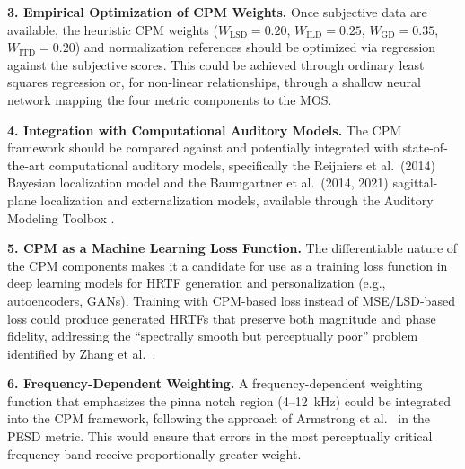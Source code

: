 \documentclass[12pt,a4paper]{article}
\begin{document}
\textbf{3. Empirical Optimization of CPM Weights.}
Once subjective data are available, the heuristic CPM weights ($W_{\mathrm{LSD}} = 0.20$, $W_{\mathrm{ILD}} = 0.25$, $W_{\mathrm{GD}} = 0.35$, $W_{\mathrm{ITD}} = 0.20$) and normalization references should be optimized via regression against the subjective scores. This could be achieved through ordinary least squares regression or, for non-linear relationships, through a shallow neural network mapping the four metric components to the MOS.

\textbf{4. Integration with Computational Auditory Models.}
The CPM framework should be compared against and potentially integrated with state-of-the-art computational auditory models, specifically the Reijniers et al.\ (2014) \cite{reijniers2014} Bayesian localization model and the Baumgartner et al.\ (2014, 2021) \cite{baumgartner2014,baumgartner2021} sagittal-plane localization and externalization models, available through the Auditory Modeling Toolbox \cite{majdak2022}.

\textbf{5. CPM as a Machine Learning Loss Function.}
The differentiable nature of the CPM components makes it a candidate for use as a training loss function in deep learning models for HRTF generation and personalization (e.g., autoencoders, GANs). Training with CPM-based loss instead of MSE/LSD-based loss could produce generated HRTFs that preserve both magnitude and phase fidelity, addressing the ``spectrally smooth but perceptually poor'' problem identified by Zhang et al.\ \cite{zhang2025}.

\textbf{6. Frequency-Dependent Weighting.}
A frequency-dependent weighting function that emphasizes the pinna notch region (4--12~kHz) could be integrated into the CPM framework, following the approach of Armstrong et al.\ \cite{armstrong2024} in the PESD metric. This would ensure that errors in the most perceptually critical frequency band receive proportionally greater weight.




\end{document}

